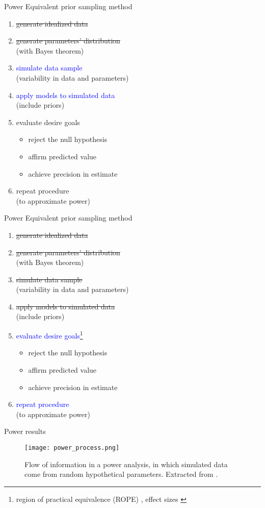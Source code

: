 %
%
\begin{lhframe}[rhgraphic={\texttt{[image: power\_function.png]}}]
	{Power}
	{Equivalent prior sampling method} 
	\begin{enumerate}
		\item \sout{generate idealized data}
		\item \sout{generate parameters' distribution} \\
		\small{(with Bayes theorem)}
		\item \textcolor{blue}{simulate data sample} \\
		\small{ (variability in data and parameters) }
		\item \textcolor{blue}{apply models to simulated data} \\
		\small{ (include priors) }
		\item evaluate desire goals
		\begin{itemize}
			\item reject the null hypothesis
			\item affirm predicted value
			\item achieve precision in estimate
		\end{itemize}
		\item repeat procedure \\
		\small{ (to approximate power) }
	\end{enumerate}
\end{lhframe}
%
%
\begin{lhframe}[rhgraphic={\texttt{[image: ES\_ROPE.png]}}]
	{Power}
	{Equivalent prior sampling method} 
	\begin{enumerate}
		\item \sout{generate idealized data}
		\item \sout{generate parameters' distribution} \\
		\small{(with Bayes theorem)}
		\item \sout{simulate data sample} \\
		\small{(variability in data and parameters)}
		\item \sout{apply models to simulated data} \\
		\small{(include priors)}
		\item \textcolor{blue}{evaluate desire goals}\footnote{region of practical equivalence (ROPE) \cite{Kruschke_2014}, effect sizes \cite{Cohen_1988, Sawilowsky_2009}}
		\begin{itemize}
			\item reject the null hypothesis
			\item affirm predicted value
			\item achieve precision in estimate
		\end{itemize}
		\item \textcolor{blue}{repeat procedure} \\
		\small{ (to approximate power) }
	\end{enumerate}
\end{lhframe}
%
%
\begin{frame}
	{Power results}
	
	\begin{figure}
		\texttt{[image: power\_process.png]}
		\caption{ Flow of information in a power analysis, in which simulated data come from random hypothetical parameters. Extracted from \citet{Kruschke_2014}. }
	\end{figure}
\end{frame}
%
%
